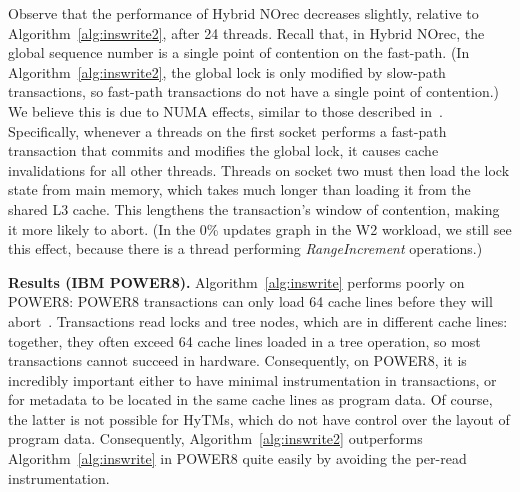Observe that the performance of Hybrid NOrec decreases slightly, relative to Algorithm~\ref{alg:inswrite2}, after 24 threads.
Recall that, in Hybrid NOrec, the global sequence number is a single point of contention on the fast-path.
(In Algorithm~\ref{alg:inswrite2}, the global lock is only modified by slow-path transactions, so fast-path transactions do not have a single point of contention.)
We believe this is due to NUMA effects, similar to those described in~\cite{BKLL16}.
Specifically, whenever a threads on the first socket performs a fast-path transaction that commits and modifies the global lock, it causes cache invalidations for all other threads.
Threads on socket two must then load the lock state from main memory, which takes much longer than loading it from the shared L3 cache.
This lengthens the transaction's window of contention, making it more likely to abort.
(In the 0\% updates graph in the W2 workload, we still see this effect, because there is a thread performing \textit{RangeIncrement} operations.)

\vspace{1mm}\noindent\textbf{Results (IBM POWER8).}
%
Algorithm~\ref{alg:inswrite} performs poorly on POWER8: POWER8 transactions can only load 64 cache lines before they will abort~\cite{nguyen-thesis}. 
Transactions read locks and tree nodes, which are in different cache lines: together, they often exceed 64 cache lines loaded in a tree operation, 
so most transactions cannot succeed in hardware. Consequently, on POWER8, 
it is incredibly important either to have minimal instrumentation in transactions, or for metadata to be located in the 
same cache lines as program data. Of course, the latter is not possible for HyTMs, which do not have control over the layout of program data.
Consequently, Algorithm~\ref{alg:inswrite2} outperforms Algorithm~\ref{alg:inswrite} in POWER8 quite easily by avoiding the per-read instrumentation. 

